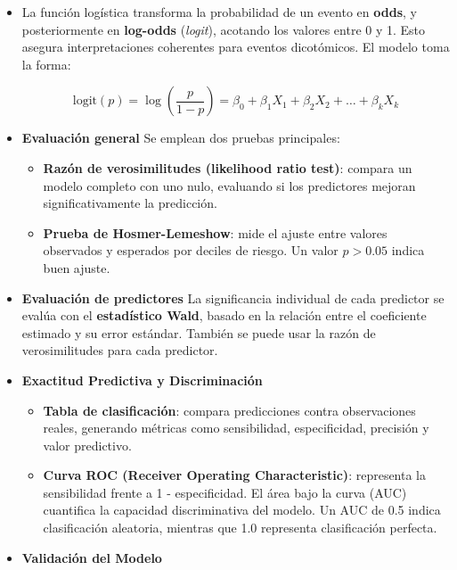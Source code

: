 \documentclass[12pt]{article}
\begin{document}
\begin{itemize}

\item La funci\'on log\'istica transforma la probabilidad de un evento en \textbf{odds}, y posteriormente en \textbf{log-odds} (\textit{logit}), acotando los valores entre 0 y 1. Esto asegura interpretaciones coherentes para eventos dicot\'omicos. El modelo toma la forma:

\[
\text{logit}(p) = \log\left(\frac{p}{1-p}\right) = \beta_0 + \beta_1X_1 + \beta_2X_2 + \ldots + \beta_kX_k
\]

\item \textbf{Evaluaci\'on general}
Se emplean dos pruebas principales:
\begin{itemize}
  \item \textbf{Raz\'on de verosimilitudes (likelihood ratio test)}: compara un modelo completo con uno nulo, evaluando si los predictores mejoran significativamente la predicci\'on.
  \item \textbf{Prueba de Hosmer-Lemeshow}: mide el ajuste entre valores observados y esperados por deciles de riesgo. Un valor $p > 0.05$ indica buen ajuste.
\end{itemize}

\item \textbf{Evaluaci\'on de predictores}
La significancia individual de cada predictor se eval\'ua con el \textbf{estad\'istico Wald}, basado en la relaci\'on entre el coeficiente estimado y su error est\'andar. Tambi\'en se puede usar la raz\'on de verosimilitudes para cada predictor.

\item \textbf{Exactitud Predictiva y Discriminaci\'on}

\begin{itemize}
  \item \textbf{Tabla de clasificaci\'on}: compara predicciones contra observaciones reales, generando m\'etricas como sensibilidad, especificidad, precisi\'on y valor predictivo.
  \item \textbf{Curva ROC (Receiver Operating Characteristic)}: representa la sensibilidad frente a 1 - especificidad. El \'area bajo la curva (AUC) cuantifica la capacidad discriminativa del modelo. Un AUC de 0.5 indica clasificaci\'on aleatoria, mientras que 1.0 representa clasificaci\'on perfecta.
\end{itemize}

\item \textbf{Validaci\'on del Modelo}


\end{itemize}
\end{document}
